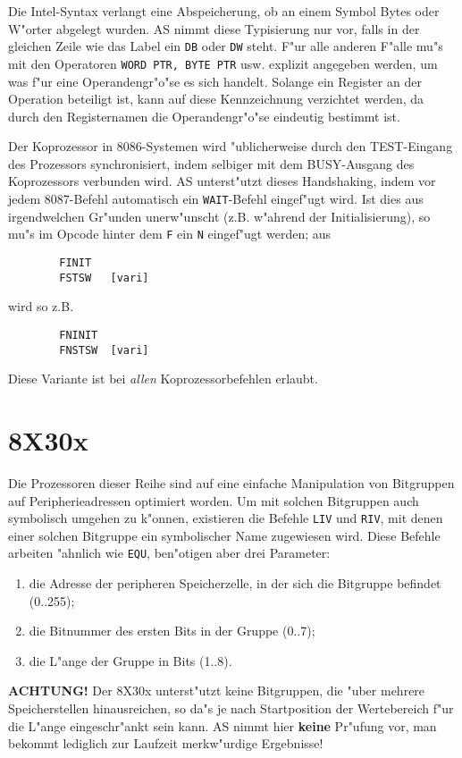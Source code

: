 \documentclass[12pt,a4paper,twoside]{report}
\newcommand{\ii}[1]{{\it #1}}
\newcommand{\bb}[1]{{\bf #1}}
\newcommand{\tty}[1]{{\tt #1}}
\begin{document}
\par
Die Intel-Syntax verlangt eine Abspeicherung, ob an einem Symbol Bytes oder
W"orter abgelegt wurden.  AS nimmt diese Typisierung nur vor, falls in der
gleichen Zeile wie das Label ein \tty{DB} oder \tty{DW} steht.  F"ur alle anderen F"alle
mu"s mit den Operatoren \tty{WORD PTR, BYTE PTR} usw. explizit angegeben werden,
um was f"ur eine Operandengr"o"se es sich handelt.  Solange ein Register an der
Operation beteiligt ist, kann auf diese Kennzeichnung verzichtet werden, da
durch den Registernamen die Operandengr"o"se eindeutig bestimmt ist.
\par
Der Koprozessor in 8086-Systemen wird "ublicherweise durch den TEST-Eingang
des Prozessors synchronisiert, indem selbiger mit dem BUSY-Ausgang des
Koprozessors verbunden wird.  AS unterst"utzt dieses Handshaking, indem
vor jedem 8087-Befehl automatisch ein \tty{WAIT}-Befehl eingef"ugt wird.  Ist
dies aus irgendwelchen Gr"unden unerw"unscht (z.B. w"ahrend der
Initialisierung), so mu"s im Opcode hinter dem \tty{F} ein \tty{N} eingef"ugt
werden; aus
\begin{verbatim}
        FINIT
        FSTSW   [vari]
\end{verbatim}
wird so z.B.
\begin{verbatim}
        FNINIT
        FNSTSW  [vari]
\end{verbatim}
Diese Variante ist bei \ii{allen} Koprozessorbefehlen erlaubt.


\section{8X30x}
\label{8X30xSpec}

Die Prozessoren dieser Reihe sind auf eine einfache Manipulation von
Bitgruppen auf Peripherieadressen optimiert worden.  Um mit solchen
Bitgruppen auch symbolisch umgehen zu k"onnen, existieren die Befehle
\tty{LIV} und \tty{RIV}, mit denen einer solchen Bitgruppe ein
symbolischer Name zugewiesen wird.  Diese Befehle arbeiten "ahnlich
wie \tty{EQU}, ben"otigen aber drei Parameter:
\begin{enumerate}
\item{die Adresse der peripheren Speicherzelle, in der sich die
      Bitgruppe befindet (0..255);}
\item{die Bitnummer des ersten Bits in der Gruppe (0..7);}
\item{die L"ange der Gruppe in Bits (1..8).}
\end{enumerate}
\bb{ACHTUNG!}  Der 8X30x unterst"utzt keine Bitgruppen, die "uber mehrere
Speicherstellen hinausreichen, so da"s je nach Startposition der
Wertebereich f"ur die L"ange eingeschr"ankt sein kann.  AS nimmt hier
\bb{keine} Pr"ufung vor, man bekommt lediglich zur Laufzeit merkw"urdige
Ergebnisse!
\end{document}
